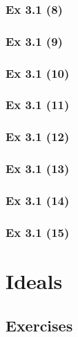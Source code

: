 \subsubsection{Ex 3.1 (8)}\label{sec:Ex_3.1.8}

\subsubsection{Ex 3.1 (9)}\label{sec:Ex_3.1.9}

\subsubsection{Ex 3.1 (10)}\label{sec:Ex_3.1.10}

\newpage		%

\subsubsection{Ex 3.1 (11)}\label{sec:Ex_3.1.11}

\subsubsection{Ex 3.1 (12)}\label{sec:Ex_3.1.12}

\subsubsection{Ex 3.1 (13)}\label{sec:Ex_3.1.13}

\subsubsection{Ex 3.1 (14)}\label{sec:Ex_3.1.14}

\subsubsection{Ex 3.1 (15)}\label{sec:Ex_3.1.15}

\newpage		%

\section{Ideals}\label{sec:3.2}
\subsection{Exercises}\label{sec:3.2_Exercises}

